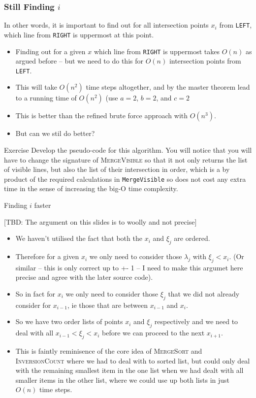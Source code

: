 \documentclass[ignorenonframetext,]{beamer}
\begin{document}
\begin{frame}
  \frametitle{Still Finding $i$}
  In other words, it is important to find out for all intersection
  points $x_i$ from \texttt{LEFT}, which line from \texttt{RIGHT} is
  uppermost at this point.
  \begin{itemize}
  \item Finding out for a given $x$ which line from \texttt{RIGHT} is
    uppermost takes $O(n)$ as argued before -- but we need to do this
    for $O(n)$ intersection points from \texttt{LEFT}. 
  \item This will take $O(n^2)$ time steps altogether, and by the
    master theorem lead to a running time of $O(n^2)$ (use $a=2$,
    $b=2$, and $c = 2$
  \item This is better than the refined brute force approach with
    $O(n^3)$.
  \item But can we stil do better?
  \end{itemize}
  \begin{block}{Exercise}
    Develop the pseudo-code for this algorithm. You will notice that
    you will have to change the signature of \textsc{MergeVisible} so
    that it not only returns the list of visible lines, but also the
    list of their intersection in order, which is a by product of the
    required calculations in \texttt{MergeVisible} so does not cost
    any extra time in the sense of increasing the big-O time complexity.
  \end{block}
\end{frame}

\begin{frame}{Finding $i$ faster}

  [TBD: The argument on this slides is to woolly and not precise]
  \begin{itemize}
  \item We haven't utilised the fact that both the $x_i$ and $\xi_j$
    are ordered. 
  \item Therefore for a given $x_i$ we only need to consider those
    $\lambda_j$ with $\xi_j < x_i$. (Or similar -- this is only
    correct up to +- 1 -- I need to make this argumet here precise and
    agree with the later source code).
  \item So in fact for $x_i$ we only need to consider those $\xi_j$ that we did
    not already consider for $x_{i-1}$, ie those that are between
    $x_{i-1}$ and $x_{i}$.
  \item So we have two order lists of points $x_i$ and $\xi_j$
    respectively and we need to deal with all $x_{i-1} < \xi_j < x_i$
    before we can proceed to the next $x_{i+1}$.
  \item This is faintly reminisence of the core idea of
    \textsc{MergeSort} and \textsc{InversionCount} where we had to
    deal with to sorted list, but could only deal with the remaining
    smallest item in the one list when we had dealt with all smaller
    items in the other list, where we could use up both lists in just
    $O(n)$ time steps.
  \end{itemize}
\end{frame}
\end{document}

